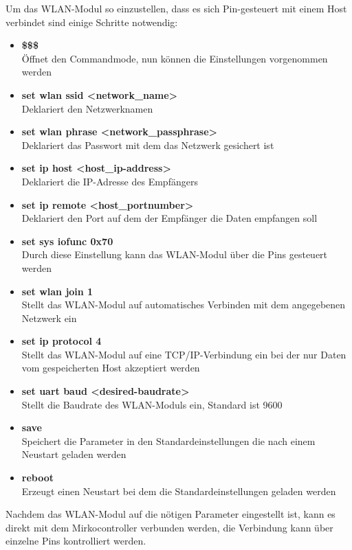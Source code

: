   Um das WLAN-Modul so einzustellen, dass es sich Pin-gesteuert mit einem Host verbindet sind einige Schritte notwendig:
  \begin{itemize}
    \item \textbf{\$\$\$}\\
    Öffnet den Commandmode, nun können die Einstellungen vorgenommen werden
    \item \textbf{set wlan ssid <network\_name>}\\
    Deklariert den Netzwerknamen
    \item \textbf{set wlan phrase <network\_passphrase>}\\
    Deklariert das Passwort mit dem das Netzwerk gesichert ist
    \item \textbf{set ip host <host\_ip-address>}\\
    Deklariert die IP-Adresse des Empfängers
    \item \textbf{set ip remote <host\_portnumber>}\\
    Deklariert den Port auf dem der Empfänger die Daten empfangen soll
    \item \textbf{set sys iofunc 0x70}\\
    Durch diese Einstellung kann das WLAN-Modul über die Pins gesteuert werden
    \item \textbf{set wlan join 1}\\
    Stellt das WLAN-Modul auf automatisches Verbinden mit dem angegebenen Netzwerk ein
    \item \textbf{set ip protocol 4}\\
    Stellt das WLAN-Modul auf eine TCP/IP-Verbindung ein bei der nur Daten vom gespeicherten Host akzeptiert werden
    \item \textbf{set uart baud <desired-baudrate>}\\
    Stellt die Baudrate des WLAN-Moduls ein, Standard ist 9600
    \item \textbf{save}\\
    Speichert die Parameter in den Standardeinstellungen die nach einem Neustart geladen werden
    \item \textbf{reboot}\\
    Erzeugt einen Neustart bei dem die Standardeinstellungen geladen werden
  \end{itemize}
  Nachdem das WLAN-Modul auf die nötigen Parameter eingestellt ist, kann es direkt mit dem Mirkocontroller verbunden werden, die Verbindung kann über einzelne Pins kontrolliert
  werden.

